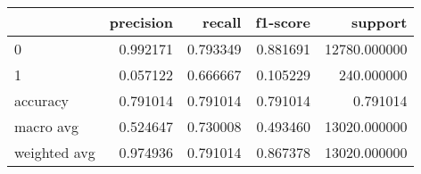 \begin{tabular}{lrrrr}
\toprule
{} &  precision &    recall &  f1-score &       support \\
\midrule
0            &   0.992171 &  0.793349 &  0.881691 &  12780.000000 \\
1            &   0.057122 &  0.666667 &  0.105229 &    240.000000 \\
accuracy     &   0.791014 &  0.791014 &  0.791014 &      0.791014 \\
macro avg    &   0.524647 &  0.730008 &  0.493460 &  13020.000000 \\
weighted avg &   0.974936 &  0.791014 &  0.867378 &  13020.000000 \\
\bottomrule
\end{tabular}
